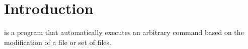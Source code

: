 \section{Introduction}

 is a program that automatically executes an arbitrary command based on the modification of a file or set of files.
